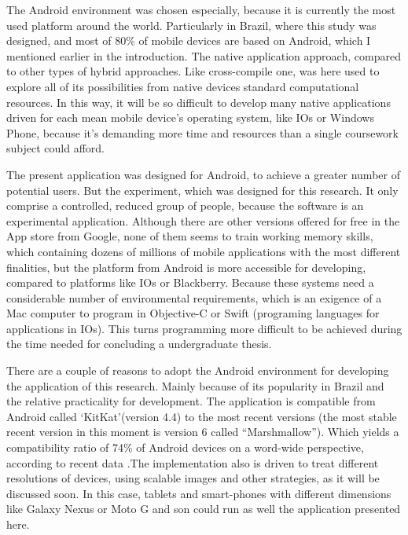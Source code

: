 The Android environment was chosen especially, because it is currently the most used platform around the world. Particularly in Brazil, where this study was designed, and most of 80\% of mobile devices are based on  Android, which I mentioned earlier in the introduction. The native application approach, compared to other types of hybrid approaches. Like cross-compile one, was here used to explore all of its possibilities from native devices standard computational resources. In this way, it will be so difficult to develop many native applications driven for each mean mobile device's operating system, like IOs or Windows Phone, because it’s demanding more time and resources than a single coursework subject could afford.

		
The present application was designed for Android, to achieve a greater number of potential users. But the experiment, which was designed for this research. It only comprise a controlled, reduced group of people, because the software is an experimental application. Although there are other versions offered for free in the App store from Google, none of them seems to train working memory skills, which containing dozens of millions of mobile applications with the most different finalities, but the platform from Android is more accessible for developing, compared to platforms like IOs or Blackberry. Because these systems need a considerable number of environmental requirements, which is an exigence  of a Mac computer to program in Objective-C or Swift (programing languages for applications in IOs). This turns programming more difficult to be achieved during the time needed for concluding a undergraduate thesis. 

There are a couple of reasons to adopt the Android environment for developing the application of this research. Mainly because of its popularity in Brazil and the relative practicality for development. The application is compatible from Android called ‘KitKat’(version 4.4) to the most recent versions (the most stable recent version in this moment is version 6 called ``Marshmallow''). Which yields a compatibility ratio of 74\% of Android devices on a word-wide perspective, according to recent data \citep{android-official}.The implementation also is driven to treat different resolutions of devices, using scalable images and other strategies, as it will be discussed soon. In this case, tablets and smart-phones with different dimensions like Galaxy Nexus or Moto G and son could run as well the application presented here. 

